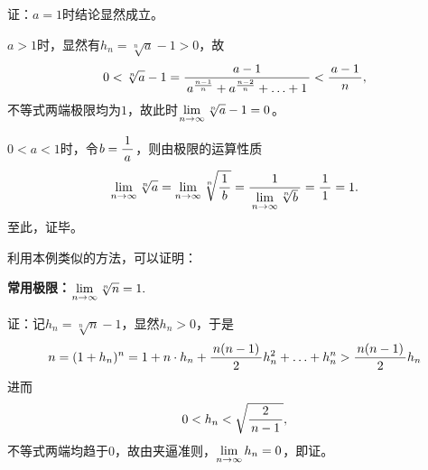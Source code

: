 证：$a=1$时结论显然成立。

$a>1$时，显然有$h_n=\sqrt[n]a-1>0$，故
\begin{align*}
	0<\sqrt[n]a-1
	=\df{a-1}{a^{\frac{n-1}n}+a^{\frac{n-2}n}+\ldots+1}
	<\df{a-1}n,
\end{align*}
不等式两端极限均为$1$，故此时$\limn{\sqrt[n]a-1}=0$。

$0<a<1$时，令$b=\df1a$，则由极限的运算性质
$$\limn\sqrt[n]a=\limn\sqrt[n]{\df1b}
=\df1{\limn\sqrt[n]b}=\df11=1.$$
至此，证毕。\fin

%
%
%

利用本例类似的方法，可以证明：
\begin{thx}
	{\bf 常用极限：}$\limn\sqrt[n]n=1.$
\end{thx}

证：记$h_n=\sqrt[n]{n}-1$，显然$h_n>0$，于是
\begin{align*}
	n=(1+h_n)^n
	=1+n\cdot h_n+\df{n(n-1)}{2}h_n^2+\ldots+h_n^n
	>\df{n(n-1)}{2}h_n
\end{align*}
进而
$$0<h_n<\sqrt{\df2{n-1}},$$
不等式两端均趋于$0$，故由夹逼准则，$\limn h_n=0$，即证。\fin

